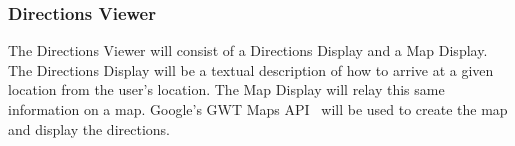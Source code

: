 \subsubsection{Directions Viewer}

The Directions Viewer will consist of a Directions Display and a Map Display. The  Directions Display will be a textual
description of how to arrive at a given location from the user's location. The Map Display will relay this same information on a map. Google's GWT Maps API~\cite{gmaps} will be used to create the map and display the directions.



